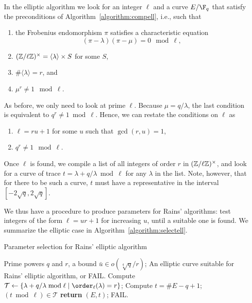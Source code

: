 In the elliptic algorithm we look for an integer $\ell$ and a curve
$E/\F_q$ that satisfy the preconditions of
Algorithm~\ref{algorithm:compell}, i.e., such that 
\begin{enumerate}
\item the Frobenius endomorphism $\pi$ satisfies a characteristic
  equation \[(\pi-\lambda)(\pi-\mu) = 0 \mod \ell,\]
\item $(\mathbb{Z}/\ell\mathbb{Z})^\times = \langle\lambda\rangle\times S$ for some $S$,
\item $\#\langle\lambda\rangle=r$, and
\item $\mu^r\ne1\mod\ell$.
\end{enumerate}

As before, we only need to look at prime $\ell$. Because
$\mu=q/\lambda$, the last condition is equivalent to
$q^r\ne1\bmod\ell$. Hence, we can restate the conditions on $\ell$ as
\begin{enumerate}
\item $\ell = ru+1$ for some $u$ such that $\gcd(r,u)=1$,
\item $q^r\ne1\mod\ell$.
\end{enumerate}
Once $\ell$ is found, we compile a list of all integers of order $r$
in $(\mathbb{Z}/\ell\mathbb{Z})^\times$, and look for a curve of trace
$t=\lambda+q/\lambda\bmod\ell$ for any $\lambda$ in the list. %
Note, however, that for there to be such a curve, $t$ must have a
representative in the interval $[-2\sqrt{q},2\sqrt{q}]$.

We thus have a procedure to produce parameters for Rains' algorithms:
test integers of the form $\ell=ur+1$ for increasing $u$, until a
suitable one is found. %
We summarize the elliptic case in Algorithm~\ref{algorithm:selectell}.

\begin{algorithm}
  \caption{Parameter selection for Rains' elliptic algorithm}
  \label{algorithm:selectell}
  \begin{algorithmic}[1]
    \REQUIRE Prime powers $q$ and $r$, a bound $\bar{u}\in o(\sqrt[4]{q}/r)$;
    \ENSURE An elliptic curve suitable for Rains' elliptic algorithm, or FAIL.
    \STATE\label{alg:selectell:ellorder} Compute $\mathcal{T} \leftarrow \{\lambda + q/\lambda \bmod\ell \;|\; \order_\ell(\lambda)=r\}$;
    \STATE\label{alg:selectell:pointcount} Compute $t = \#E - q + 1$;
     $(t\bmod\ell)\in\mathcal{T}$ {\bf return} $(E, t)$;
    \ENDFOR
    \ENDIF
    \ENDFOR
    \RETURN FAIL.
  \end{algorithmic}
\end{algorithm}

